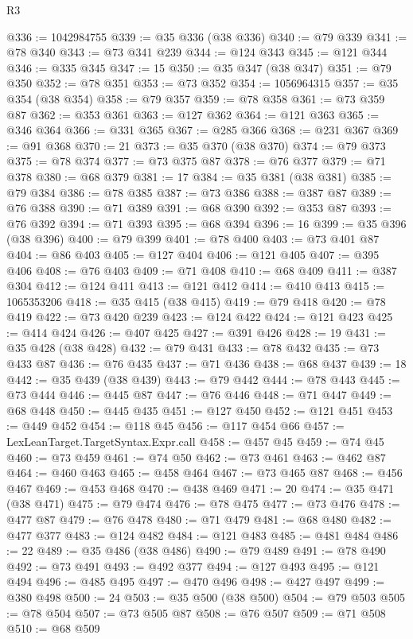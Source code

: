 \begin{lexlean}{R3}
\begin{coremodule}
@336 := 1042984755
@339 := @35 @336 (@38 @336)
@340 := @79 @339
@341 := @78 @340
@343 := @73 @341 @239
@344 := @124 @343
@345 := @121 @344
@346 := @335 @345
@347 := 15
@350 := @35 @347 (@38 @347)
@351 := @79 @350
@352 := @78 @351
@353 := @73 @352
@354 := 1056964315
@357 := @35 @354 (@38 @354)
@358 := @79 @357
@359 := @78 @358
@361 := @73 @359 @87
@362 := @353 @361
@363 := @127 @362
@364 := @121 @363
@365 := @346 @364
@366 := @331 @365
@367 := @285 @366
@368 := @231 @367
@369 := @91 @368
@370 := 21
@373 := @35 @370 (@38 @370)
@374 := @79 @373
@375 := @78 @374
@377 := @73 @375 @87
@378 := @76 @377
@379 := @71 @378
@380 := @68 @379
@381 := 17
@384 := @35 @381 (@38 @381)
@385 := @79 @384
@386 := @78 @385
@387 := @73 @386
@388 := @387 @87
@389 := @76 @388
@390 := @71 @389
@391 := @68 @390
@392 := @353 @87
@393 := @76 @392
@394 := @71 @393
@395 := @68 @394
@396 := 16
@399 := @35 @396 (@38 @396)
@400 := @79 @399
@401 := @78 @400
@403 := @73 @401 @87
@404 := @86 @403
@405 := @127 @404
@406 := @121 @405
@407 := @395 @406
@408 := @76 @403
@409 := @71 @408
@410 := @68 @409
@411 := @387 @304
@412 := @124 @411
@413 := @121 @412
@414 := @410 @413
@415 := 1065353206
@418 := @35 @415 (@38 @415)
@419 := @79 @418
@420 := @78 @419
@422 := @73 @420 @239
@423 := @124 @422
@424 := @121 @423
@425 := @414 @424
@426 := @407 @425
@427 := @391 @426
@428 := 19
@431 := @35 @428 (@38 @428)
@432 := @79 @431
@433 := @78 @432
@435 := @73 @433 @87
@436 := @76 @435
@437 := @71 @436
@438 := @68 @437
@439 := 18
@442 := @35 @439 (@38 @439)
@443 := @79 @442
@444 := @78 @443
@445 := @73 @444
@446 := @445 @87
@447 := @76 @446
@448 := @71 @447
@449 := @68 @448
@450 := @445 @435
@451 := @127 @450
@452 := @121 @451
@453 := @449 @452
@454 := @118 @45
@456 := @117 @454 @66
@457 := LexLeanTarget.TargetSyntax.Expr.call
@458 := @457 @45
@459 := @74 @45
@460 := @73 @459
@461 := @74 @50
@462 := @73 @461
@463 := @462 @87
@464 := @460 @463
@465 := @458 @464
@467 := @73 @465 @87
@468 := @456 @467
@469 := @453 @468
@470 := @438 @469
@471 := 20
@474 := @35 @471 (@38 @471)
@475 := @79 @474
@476 := @78 @475
@477 := @73 @476
@478 := @477 @87
@479 := @76 @478
@480 := @71 @479
@481 := @68 @480
@482 := @477 @377
@483 := @124 @482
@484 := @121 @483
@485 := @481 @484
@486 := 22
@489 := @35 @486 (@38 @486)
@490 := @79 @489
@491 := @78 @490
@492 := @73 @491
@493 := @492 @377
@494 := @127 @493
@495 := @121 @494
@496 := @485 @495
@497 := @470 @496
@498 := @427 @497
@499 := @380 @498
@500 := 24
@503 := @35 @500 (@38 @500)
@504 := @79 @503
@505 := @78 @504
@507 := @73 @505 @87
@508 := @76 @507
@509 := @71 @508
@510 := @68 @509

\end{coremodule}
\end{lexlean}
